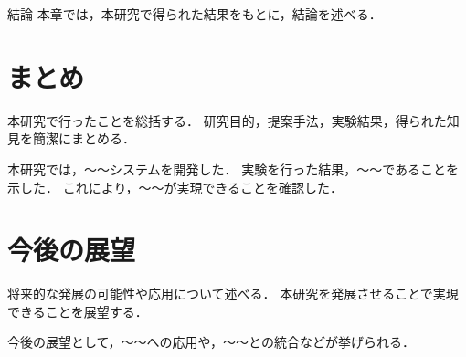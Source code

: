\chapterhead
{結論}
{本章では，本研究で得られた結果をもとに，結論を述べる．}

\section{まとめ}
本研究で行ったことを総括する．
研究目的，提案手法，実験結果，得られた知見を簡潔にまとめる．

本研究では，〜〜システムを開発した．
実験を行った結果，〜〜であることを示した．
これにより，〜〜が実現できることを確認した．

\newpage

\section{今後の展望}
将来的な発展の可能性や応用について述べる．
本研究を発展させることで実現できることを展望する．

今後の展望として，〜〜への応用や，〜〜との統合などが挙げられる．

\newpage
